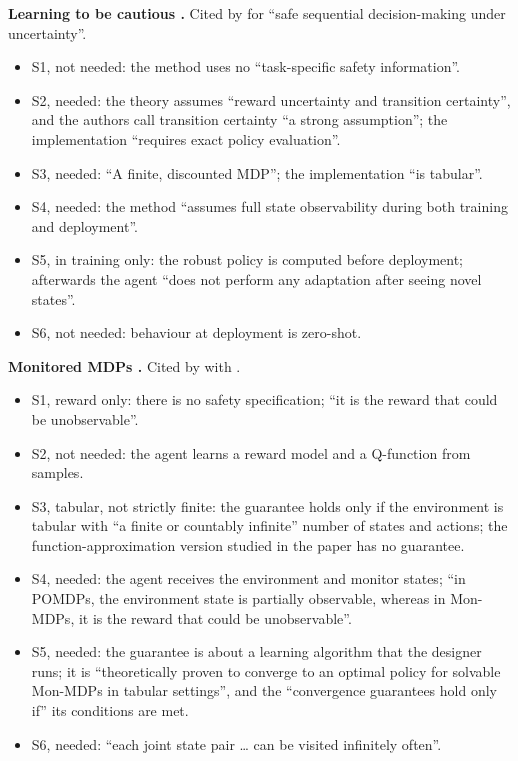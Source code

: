 \documentclass{article}
\providecommand{\tightlist}{\setlength{\itemsep}{0pt}\setlength{\parskip}{0pt}}
\begin{document}
\textbf{Learning to be cautious \citep{mohammedalamen2025a}.} Cited by \citet{mclean2026} for ``safe sequential decision-making under uncertainty''.

\begin{itemize}
\tightlist
\item
  S1, not needed: the method uses no ``task-specific safety information''.
\item
  S2, needed: the theory assumes ``reward uncertainty and transition certainty'', and the authors call transition certainty ``a strong assumption''; the implementation ``requires exact policy evaluation''.
\item
  S3, needed: ``A finite, discounted MDP''; the implementation ``is tabular''.
\item
  S4, needed: the method ``assumes full state observability during both training and deployment''.
\item
  S5, in training only: the robust policy is computed before deployment; afterwards the agent ``does not perform any adaptation after seeing novel states''.
\item
  S6, not needed: behaviour at deployment is zero-shot.
\end{itemize}

\textbf{Monitored MDPs \citep{mohammedalamen2025b}.} Cited by \citet{mclean2026} with \citet{mohammedalamen2025a}.

\begin{itemize}
\tightlist
\item
  S1, reward only: there is no safety specification; ``it is the reward that could be unobservable''.
\item
  S2, not needed: the agent learns a reward model and a Q-function from samples.
\item
  S3, tabular, not strictly finite: the guarantee holds only if the environment is tabular with ``a finite or countably infinite'' number of states and actions; the function-approximation version studied in the paper has no guarantee.
\item
  S4, needed: the agent receives the environment and monitor states; ``in POMDPs, the environment state is partially observable, whereas in Mon-MDPs, it is the reward that could be unobservable''.
\item
  S5, needed: the guarantee is about a learning algorithm that the designer runs; it is ``theoretically proven to converge to an optimal policy for solvable Mon-MDPs in tabular settings'', and the ``convergence guarantees hold only if'' its conditions are met.
\item
  S6, needed: ``each joint state pair \ldots{} can be visited infinitely often''.
\end{itemize}
\end{document}
